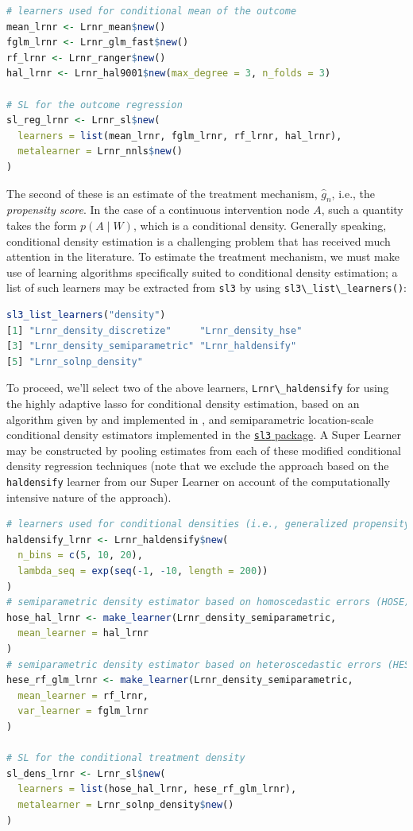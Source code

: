 \documentclass[
  12pt, krantz2,
]{krantz}
\newcommand{\passthrough}[1]{#1}
\theoremstyle{definition}
\theoremstyle{definition}
\theoremstyle{definition}
\newcommand{\1}{\mathbbm{1}}
\begin{document}
\begin{lstlisting}[language=R]
# learners used for conditional mean of the outcome
mean_lrnr <- Lrnr_mean$new()
fglm_lrnr <- Lrnr_glm_fast$new()
rf_lrnr <- Lrnr_ranger$new()
hal_lrnr <- Lrnr_hal9001$new(max_degree = 3, n_folds = 3)

# SL for the outcome regression
sl_reg_lrnr <- Lrnr_sl$new(
  learners = list(mean_lrnr, fglm_lrnr, rf_lrnr, hal_lrnr),
  metalearner = Lrnr_nnls$new()
)
\end{lstlisting}

The second of these is an estimate of the treatment mechanism, \(\hat{g}_n\),
i.e., the \emph{propensity score}. In the case of a continuous intervention node \(A\),
such a quantity takes the form \(p(A \mid W)\), which is a conditional density.
Generally speaking, conditional density estimation is a challenging problem that
has received much attention in the literature. To estimate the treatment
mechanism, we must make use of learning algorithms specifically suited to
conditional density estimation; a list of such learners may be extracted from
\passthrough{\lstinline!sl3!} by using \passthrough{\lstinline!sl3\_list\_learners()!}:

\begin{lstlisting}[language=R]
sl3_list_learners("density")
[1] "Lrnr_density_discretize"     "Lrnr_density_hse"           
[3] "Lrnr_density_semiparametric" "Lrnr_haldensify"            
[5] "Lrnr_solnp_density"         
\end{lstlisting}

To proceed, we'll select two of the above learners, \passthrough{\lstinline!Lrnr\_haldensify!} for using
the highly adaptive lasso for conditional density estimation, based on an
algorithm given by \citet{diaz2011super} and implemented in \citet{hejazi2020haldensify}, and
semiparametric location-scale conditional density estimators implemented in the
\href{https://github.com/tlverse/sl3}{\passthrough{\lstinline!sl3!} package}. A Super Learner may be
constructed by pooling estimates from each of these modified conditional density
regression techniques (note that we exclude the approach based on the
\passthrough{\lstinline!haldensify!} learner from our Super Learner on account of the computationally
intensive nature of the approach).

\begin{lstlisting}[language=R]
# learners used for conditional densities (i.e., generalized propensity score)
haldensify_lrnr <- Lrnr_haldensify$new(
  n_bins = c(5, 10, 20),
  lambda_seq = exp(seq(-1, -10, length = 200))
)
# semiparametric density estimator based on homoscedastic errors (HOSE)
hose_hal_lrnr <- make_learner(Lrnr_density_semiparametric,
  mean_learner = hal_lrnr
)
# semiparametric density estimator based on heteroscedastic errors (HESE)
hese_rf_glm_lrnr <- make_learner(Lrnr_density_semiparametric,
  mean_learner = rf_lrnr,
  var_learner = fglm_lrnr
)

# SL for the conditional treatment density
sl_dens_lrnr <- Lrnr_sl$new(
  learners = list(hose_hal_lrnr, hese_rf_glm_lrnr),
  metalearner = Lrnr_solnp_density$new()
)
\end{lstlisting}
\end{document}
